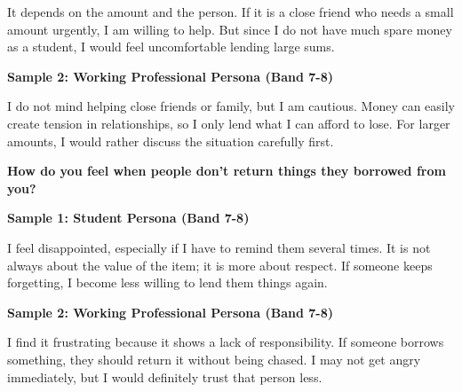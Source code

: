 It depends on the amount and the person. If it is a close friend who needs a small amount urgently, I am willing to help. But since I do not have much spare money as a student, I would feel uncomfortable lending large sums.

\textbf{Sample 2: Working Professional Persona (Band 7-8)}

I do not mind helping close friends or family, but I am cautious. Money can easily create tension in relationships, so I only lend what I can afford to lose. For larger amounts, I would rather discuss the situation carefully first.

\separator

\begin{ieltsquestion}
\textbf{How do you feel when people don't return things they borrowed from you?}
\end{ieltsquestion}
\textbf{Sample 1: Student Persona (Band 7-8)}

I feel disappointed, especially if I have to remind them several times. It is not always about the value of the item; it is more about respect. If someone keeps forgetting, I become less willing to lend them things again.

\textbf{Sample 2: Working Professional Persona (Band 7-8)}

I find it frustrating because it shows a lack of responsibility. If someone borrows something, they should return it without being chased. I may not get angry immediately, but I would definitely trust that person less.

\separator


